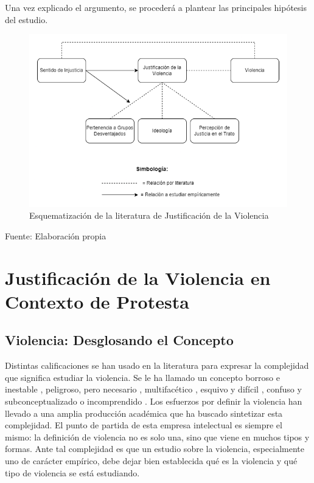 \documentclass[12pt,twoside]{templates/facsothesis}
\begin{document}
Una vez explicado el argumento, se procederá a plantear las principales hipótesis del estudio.

\begin{figure}[!ht]
\includegraphics[width=0.75\linewidth,]{images/newmodel} \caption{Esquematización de la literatura de Justificación de la Violencia}\label{fig:newmodel}
\end{figure}

Fuente: Elaboración propia

\hypertarget{justificaciuxf3n-de-la-violencia-en-contexto-de-protesta}{%
\section{Justificación de la Violencia en Contexto de Protesta}\label{justificaciuxf3n-de-la-violencia-en-contexto-de-protesta}}

\hypertarget{violencia-desglosando-el-concepto}{%
\subsection{Violencia: Desglosando el Concepto}\label{violencia-desglosando-el-concepto}}

Distintas calificaciones se han usado en la literatura para expresar la complejidad que significa estudiar la violencia. Se le ha llamado un concepto borroso e inestable \citep{Mider2013}, peligroso, pero necesario \citep{Keane2004}, multifacético \citep{Heitmeyer2005}, esquivo y difícil \citep{Imbusch2005}, confuso y subconceptualizado \citep{Stateva2009} o incomprendido \citep{Bufacchi2007}. Los esfuerzos por definir la violencia han llevado a una amplia producción académica \citep[e.g.][]{Kurt2008, Heitmeyer2005, Bufacchi2009a} que ha buscado sintetizar esta complejidad. El punto de partida de esta empresa intelectual es siempre el mismo: la definición de violencia no es solo una, sino que viene en muchos tipos y formas. Ante tal complejidad es que un estudio sobre la violencia, especialmente uno de carácter empírico, debe dejar bien establecida qué es la violencia y qué tipo de violencia se está estudiando.
\end{document}
